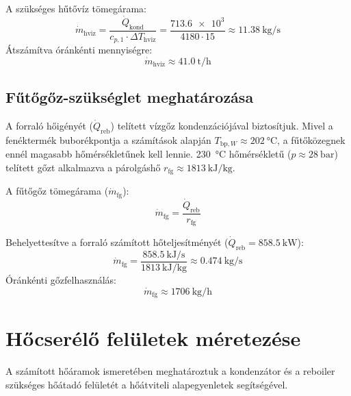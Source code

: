 A szükséges hűtővíz tömegárama:
\begin{equation}
    \dot{m}_{\text{hviz}} = \frac{\dot{Q}_{\text{kond}}}{c_{p, 1} \cdot \Delta T_{\text{hviz}}} = \frac{\num{713.6e3}}{\num{4180} \cdot \num{15}} \approx \qty{11.38}{\kg\per\second}
\end{equation}
Átszámítva óránkénti mennyiségre:
\begin{equation}
    \dot{m}_{\text{hviz}} \approx \qty{41.0}{\tonne\per\hour}
\end{equation}

\subsection{Fűtőgőz-szükséglet meghatározása}

A forraló hőigényét ($\dot{Q}_{\text{reb}}$) telített vízgőz kondenzációjával biztosítjuk. Mivel a fenéktermék buborékpontja a számítások alapján $T_{\text{bp}, W} \approx \qty{202}{\celsius}$, a fűtőközegnek ennél magasabb hőmérsékletűnek kell lennie. \qty{230}{\celsius} hőmérsékletű ($p \approx \qty{28}{\bar}$) telített gőzt alkalmazva a párolgáshő $r_{\text{fg}} \approx \qty{1813}{\kilo\joule\per\kg}$.

A fűtőgőz tömegárama ($\dot{m}_{\text{fg}}$):
\begin{equation}
    \dot{m}_{\text{fg}} = \frac{\dot{Q}_{\text{reb}}}{r_{\text{fg}}}
\end{equation}

Behelyettesítve a forraló számított hőteljesítményét ($\dot{Q}_{\text{reb}} = \qty{858.5}{\kilo\watt}$):
\begin{equation}
    \dot{m}_{\text{fg}} = \frac{\qty{858.5}{\kilo\joule\per\second}}{\qty{1813}{\kilo\joule\per\kg}} \approx \qty{0.474}{\kg\per\second}
\end{equation}
Óránkénti gőzfelhasználás:
\begin{equation}
    \dot{m}_{\text{fg}} \approx \qty{1706}{\kg\per\hour}
\end{equation}

\section{Hőcserélő felületek méretezése}

A számított hőáramok ismeretében meghatároztuk a kondenzátor és a
reboiler szükséges hőátadó felületét a hőátviteli alapegyenletek segítségével.

